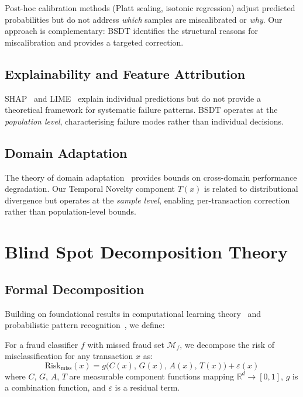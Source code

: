 \documentclass[journal]{IEEEtran}
\newcommand{\R}{\mathbb{R}}
\begin{document}
Post-hoc calibration methods (Platt scaling, isotonic regression) adjust predicted probabilities but do not address \textit{which} samples are miscalibrated or \textit{why}. Our approach is complementary: BSDT identifies the structural reasons for miscalibration and provides a targeted correction.

\subsection{Explainability and Feature Attribution}

SHAP~\cite{lundberg2017} and LIME~\cite{ribeiro2016} explain individual predictions but do not provide a theoretical framework for systematic failure patterns. BSDT operates at the \textit{population level}, characterising failure modes rather than individual decisions.

\subsection{Domain Adaptation}

The theory of domain adaptation~\cite{bendavid2010} provides bounds on cross-domain performance degradation. Our Temporal Novelty component $T(x)$ is related to distributional divergence but operates at the \textit{sample level}, enabling per-transaction correction rather than population-level bounds.

\section{Blind Spot Decomposition Theory}
\label{sec:bsdt}

\subsection{Formal Decomposition}
\label{ssec:decomposition}

Building on foundational results in computational learning theory~\cite{valiant1984} and probabilistic pattern recognition~\cite{devroye1996}, we define:

\begin{definition}
For a fraud classifier $f$ with missed fraud set $\mathcal{M}_f$, we decompose the risk of misclassification for any transaction $x$ as:
\begin{equation}
  \text{Risk}_{\text{miss}}(x) = g\bigl(C(x),\, G(x),\, A(x),\, T(x)\bigr) + \varepsilon(x)
  \label{eq:decomposition}
\end{equation}
where $C$, $G$, $A$, $T$ are measurable component functions mapping $\R^d \to [0,1]$, $g$ is a combination function, and $\varepsilon$ is a residual term.
\end{definition}
\end{document}
